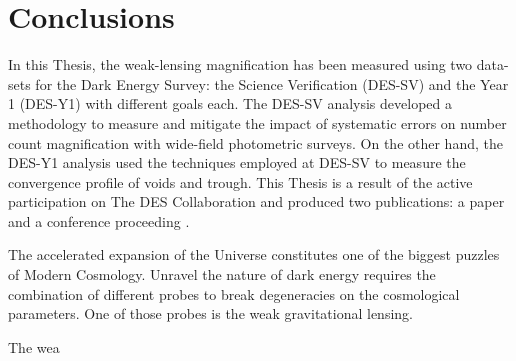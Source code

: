 \chapter{Conclusions}
\label{ch:conclusions}
In this Thesis, the weak-lensing magnification has been measured using two data-sets for the Dark Energy Survey: the Science Verification (DES-SV) and the Year 1 (DES-Y1) with different goals each. The DES-SV analysis developed a methodology to measure and mitigate the impact of systematic errors on number count magnification with wide-field photometric surveys. On the other hand, the DES-Y1 analysis used the techniques employed at DES-SV to measure the convergence profile of voids and trough. This Thesis is a result of the active participation on The DES Collaboration and produced two publications: a paper \cite{2016arXiv161110326G} and a conference proceeding \cite{2017hsa9.conf..163G}.
\newline

The accelerated expansion of the Universe constitutes one of the biggest puzzles of Modern Cosmology. Unravel the nature of dark energy requires the combination of different probes to break degeneracies on the cosmological parameters. One of those probes is the weak gravitational lensing.
\newline

The wea